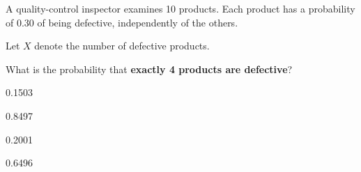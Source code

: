 
\begin{question}
A quality-control inspector examines 10 products. Each product has a probability of 0.30 of being defective, independently of the others.

Let \(X\) denote the number of defective products.

What is the probability that \textbf{exactly 4 products are defective}?
\begin{answerlist}
  \item 0.1503
  \item 0.8497
  \item 0.2001
  \item 0.6496
\end{answerlist}
\end{question}


